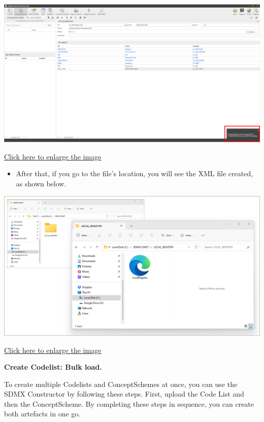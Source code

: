 \documentclass[
]{book}
\providecommand{\tightlist}{%
  \setlength{\itemsep}{0pt}\setlength{\parskip}{0pt}}
\begin{document}
\begin{center}\includegraphics[width=1\linewidth]{./images/image127} \end{center}

\href{images/image127.png}{Click here to enlarge the image}

\begin{itemize}
\tightlist
\item
  After that, if you go to the file's location, you will see the XML file created, as shown below.
\end{itemize}

\begin{center}\includegraphics[width=1\linewidth]{./images/image129} \end{center}

\href{images/image129.png}{Click here to enlarge the image}

\textbf{Create Codelist: Bulk load.}

To create multiple Codelists and ConceptSchemes at once, you can use the SDMX Constructor by following these steps. First, upload the Code List and then the ConceptScheme. By completing these steps in sequence, you can create both artefacts in one go.
\end{document}
